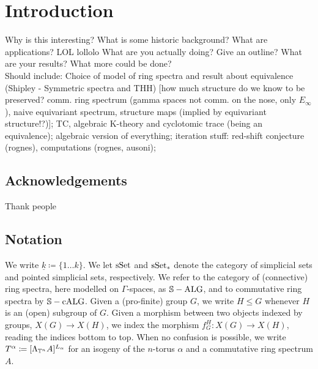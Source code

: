 \section{Introduction}
Why is this interesting? What is some historic background? What are applications? LOL lollolo What are you actually doing? Give an outline? What are your results? What more could be done?\\
Should include: Choice of model of ring spectra and result about equivalence (Shipley - Symmetric spectra and THH) [how much structure do we know to be preserved? comm. ring spectrum (gamma spaces not comm. on the nose, only $E_\infty$), naive equivariant spectrum, structure maps (implied by equivariant structure!?)]; TC, algebraic K-theory and cyclotomic trace (being an equivalence); algebraic version of everything; iteration stuff: red-shift conjecture (rognes), computations (rognes, ausoni);
\subsection{Acknowledgements}
Thank people %
\subsection{Notation}
We write $\underline{k} \coloneqq \{1 \ldots k \}$. We let $\mathrm{sSet}$ and $\mathrm{sSet}_*$ denote the category of simplicial sets and pointed simplicial sets, respectively. We refer to the category of (connective) ring spectra, here modelled on $\Gamma$-spaces, as $\mathbb{S}-\mathrm{ALG}$, and to commutative ring spectra by $\mathbb{S}-\mathrm{cALG}$. Given a (pro-finite) group $G$, we write $H \leq G$ whenever $H$ is an (open) subgroup of $G$. Given a morphism between two objects indexed by groups, $X(G) \to X(H)$, we index the morphism $f_G^H: X(G) \to X(H)$, reading the indices bottom to top. When no confusion is possible, we write $T^\alpha \coloneqq [\Lambda_{\mathbb{T}^n} A]^{L_\alpha}$ for an isogeny of the $n$-torus $\alpha$ and a commutative ring spectrum $A$.
